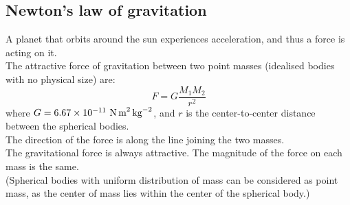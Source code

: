 \documentclass[a4paper,12pt]{article}
\begin{document}
\subsection{Newton's law of gravitation}
A planet that orbits around the sun experiences acceleration, and thus a force is acting on it.\\
The attractive force of gravitation between two point masses (idealised bodies with no physical size) are:
\[F=G\dfrac{M_1M_2}{r^2}\]
where $G=6.67\times 10^{-11}\ \text{N\,m}^{2}\,\text{kg}^{-2}$, and $r$ is the center-to-center distance between the spherical bodies.\\
The direction of the force is along the line joining the two masses.\\
The gravitational force is always attractive. The magnitude of the force on each mass is the same.\\
(Spherical bodies with uniform distribution of mass can be considered as point mass, as the center of mass lies within the center of the spherical body.)
\end{document}
